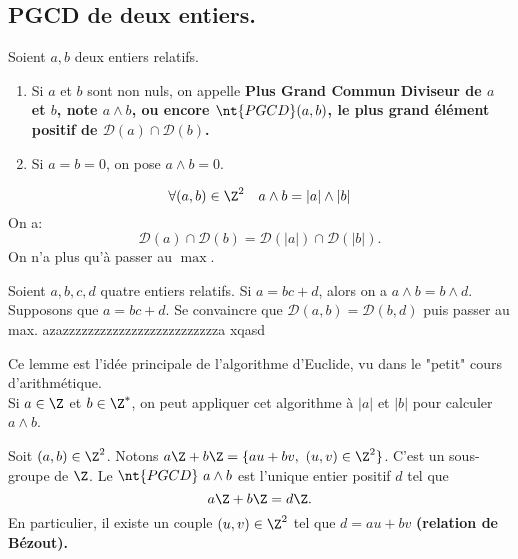 \documentclass[11pt]{article}
\newcommand*{\PGCD}{\nt{PGCD}}
\renewcommand*{\D}{\mathcal{D}}
\begin{document}
\subsection{PGCD de deux entiers.}

\begin{defi}{}{}
    Soient $a,b$ deux entiers relatifs.
    \begin{enumerate}[topsep=0pt,itemsep=-0.9 ex]
        \item Si $a$ et $b$ sont non nuls, on appelle \bf{Plus Grand Commun Diviseur} de $a$ et $b$, note $a\land b$, ou encore $\PGCD(a,b)$, le plus grand élément positif de $\D(a)\cap\D(b)$.
        \item Si $a=b=0$, on pose $a\land b=0$.
    \end{enumerate}
\end{defi}

\begin{prop}{}{}
    \begin{equation*}
        \forall (a,b)\in\Z^2\quad a\land b = |a|\land|b|
    \end{equation*}
    \tcblower
    On a:
    \begin{equation*}
        \D(a)\cap\D(b)=\D(|a|)\cap\D(|b|).
    \end{equation*}
    On n'a plus qu'à passer au $\max$.
\end{prop}

\begin{prop}{}{}
    Soient $a,b,c,d$ quatre entiers relatifs. Si $a=bc+d$, alors on a $a\land b=b\land d$.
    \tcblower
    Supposons que $a=bc+d$. Se convaincre que $\D(a,b)=\D(b,d)$ puis passer au max.             azazzzzzzzzzzzzzzzzzzzzzzzzza  xqasd
\end{prop}

\begin{meth}{}{}
    Ce lemme est l'idée principale de l'algorithme d'Euclide, vu dans le "petit" cours d'arithmétique.\\
    Si $a\in\Z$ et $b\in\Z^*$, on peut appliquer cet algorithme à $|a|$ et $|b|$ pour calculer $a\land b$.
\end{meth}

\begin{prop}{}{}
    Soit $(a,b)\in\Z^2$. Notons $a\Z+b\Z=\{au+bv,~(u,v)\in\Z^2\}$. C'est un sous-groupe de $\Z$.\n
    Le $\PGCD~a\land b$ est l'unique entier positif $d$ tel que
    \begin{equation*}
        a\Z+b\Z=d\Z.
    \end{equation*}
    En particulier, il existe un couple $(u,v)\in\Z^2$ tel que $d=au+bv$ \bf{(relation de Bézout)}.
\end{prop}
\end{document}
